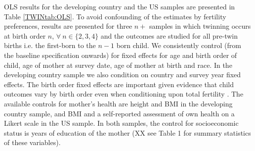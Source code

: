 \documentclass[subeqn]{article}
\begin{document}
\begin{spacing}{1.4}

OLS results for the developing country and the US samples are presented in Table \ref{TWINtab:OLS}. To avoid confounding of the estimates by fertility preferences, results are presented for three $n+$ samples in which twinning occurs at birth order $n$, $\forall\ n \in \{2, 3, 4\}$ and the outcomes are studied for all pre-twin births i.e. the first-born to the $n-1$ born child. We consistently control (from the baseline specification onwards) for fixed effects for age and birth order of child, age of mother at survey date, age of mother at birth and race. In the developing country sample we also condition on country and survey year fixed effects. The birth order fixed effects are important given evidence that child outcomes vary by birth order even when conditioning upon total fertility \citep{Blacketal2005}. The available controls for mother's health are height and BMI in the developing country sample, and BMI and a self-reported assessment of own health on a Likert scale in the US sample. In both samples, the control for socioeconomic status is years of education of the mother (XX see Table 1 for summary statistics of these variables).


\end{spacing}
\end{document}
